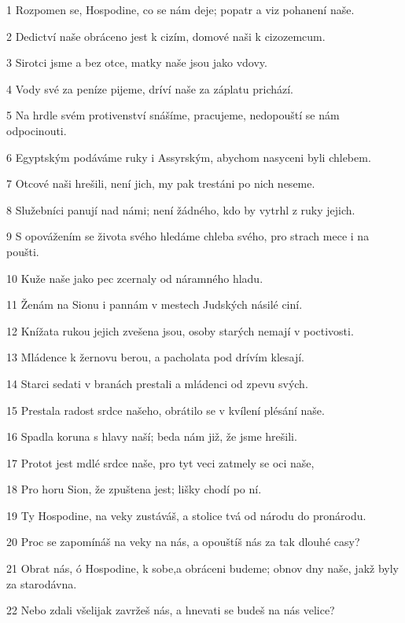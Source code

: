 \par 1 Rozpomen se, Hospodine, co se nám deje; popatr a viz pohanení naše.
\par 2 Dedictví naše obráceno jest k cizím, domové naši k cizozemcum.
\par 3 Sirotci jsme a bez otce, matky naše jsou jako vdovy.
\par 4 Vody své za peníze pijeme, dríví naše za záplatu prichází.
\par 5 Na hrdle svém protivenství snášíme, pracujeme, nedopouští se nám odpocinouti.
\par 6 Egyptským podáváme ruky i Assyrským, abychom nasyceni byli chlebem.
\par 7 Otcové naši hrešili, není jich, my pak trestáni po nich neseme.
\par 8 Služebníci panují nad námi; není žádného, kdo by vytrhl z ruky jejich.
\par 9 S opovážením se života svého hledáme chleba svého, pro strach mece i na poušti.
\par 10 Kuže naše jako pec zcernaly od náramného hladu.
\par 11 Ženám na Sionu i pannám v mestech Judských násilé ciní.
\par 12 Knížata rukou jejich zvešena jsou, osoby starých nemají v poctivosti.
\par 13 Mládence k žernovu berou, a pacholata pod drívím klesají.
\par 14 Starci sedati v branách prestali a mládenci od zpevu svých.
\par 15 Prestala radost srdce našeho, obrátilo se v kvílení plésání naše.
\par 16 Spadla koruna s hlavy naší; beda nám již, že jsme hrešili.
\par 17 Protot jest mdlé srdce naše, pro tyt veci zatmely se oci naše,
\par 18 Pro horu Sion, že zpuštena jest; lišky chodí po ní.
\par 19 Ty Hospodine, na veky zustáváš, a stolice tvá od národu do pronárodu.
\par 20 Proc se zapomínáš na veky na nás, a opouštíš nás za tak dlouhé casy?
\par 21 Obrat nás, ó Hospodine, k sobe,a obráceni budeme; obnov dny naše, jakž byly za starodávna.
\par 22 Nebo zdali všelijak zavržeš nás, a hnevati se budeš na nás velice?

